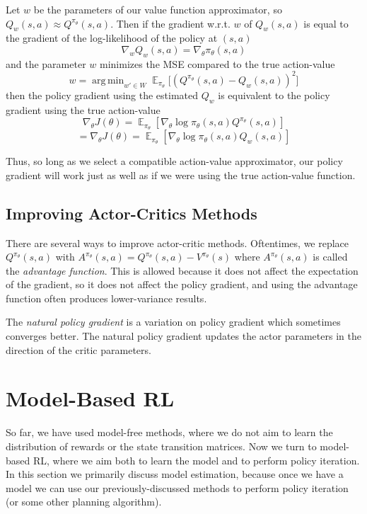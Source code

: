\documentclass{article}
\DeclareMathOperator{\argmin}{arg\,min}
\DeclareMathOperator{\EX}{\mathbb{E}}
\newcommand{\ita}{\textit}
\begin{document}
Let $w$ be the parameters of our value function approximator, so $Q_w(s, a)\approx Q^{\pi_\theta}(s, a)$. Then if the gradient w.r.t. $w$ of $Q_w(s, a)$ is equal to the gradient of the log-likelihood of the policy at $(s, a)$
$$\nabla_w Q_w(s, a) = \nabla_\theta \pi_\theta(s, a)$$
and the parameter $w$ minimizes the MSE compared to the true action-value
$$w = \argmin_{w'\in W} \EX_{\pi_\theta}\big[(Q^{\pi_\theta}(s, a) - Q_w(s, a))^2\big]$$
then the policy gradient using the estimated $Q_w$ is equivalent to the policy gradient using the true action-value
$$\nabla_\theta J(\theta)=\EX_{\pi_\theta}[\nabla_\theta\log \pi_\theta(s, a)Q^{\pi_\theta}(s, a)]$$
$$= \nabla_\theta J(\theta)=\EX_{\pi_\theta}[\nabla_\theta\log \pi_\theta(s, a)Q_w(s, a)]$$

Thus, so long as we select a compatible action-value approximator, our policy gradient will work just as well as if we were using the true action-value function.

\subsection{Improving Actor-Critics Methods}

There are several ways to improve actor-critic methods. Oftentimes, we replace $Q^{\pi_\theta}(s, a)$ with $A^{\pi_\theta}(s, a)=Q^{\pi_\theta}(s, a) - V^{\pi_\theta}(s)$ where $A^{\pi_\theta}(s, a)$ is called the \ita{advantage function}. This is allowed because it does not affect the expectation of the gradient, so it does not affect the policy gradient, and using the advantage function often produces lower-variance results.

The \ita{natural policy gradient} is a variation on policy gradient which sometimes converges better. The natural policy gradient updates the actor parameters in the direction of the critic parameters.

\section{Model-Based RL}

So far, we have used model-free methods, where we do not aim to learn the distribution of rewards or the state transition matrices. Now we turn to model-based RL, where we aim both to learn the model and to perform policy iteration. In this section we primarily discuss model estimation, because once we have a model we can use our previously-discussed methods to perform policy iteration (or some other planning algorithm).
\end{document}
